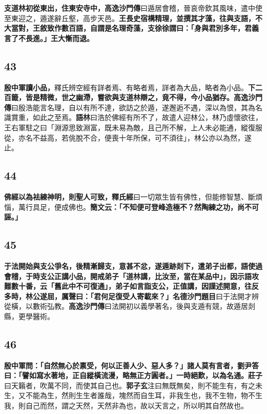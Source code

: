 \textbf{支道林初從東出，住東安寺中，}{\footnotesize \textbf{高逸沙門傳}曰遁居會稽，晉哀帝欽其風味，遣中使至東迎之，遁遂辭丘壑，高步天邑。}\textbf{王長史宿構精理，並撰其才藻，往與支語，不大當對，王敘致作數百語，自謂是名理奇藻，支徐徐謂曰：「身與君別多年，君義言了不長進。」王大慚而退。}

\subsection*{43}

\textbf{殷中軍讀小品，}{\footnotesize 釋氏辨空經有詳者焉、有略者焉，詳者為大品，略者為小品。}\textbf{下二百籤，皆是精微，世之幽滯，嘗欲與支道林辯之，竟不得，今小品猶存。}{\footnotesize \textbf{高逸沙門傳}曰殷浩能言名理，自以有所不達，欲訪之於遁，遂邂逅不遇，深以為恨，其為名識賞重，如此之至焉。\textbf{語林}曰浩於佛經有所不了，故遣人迎林公，林乃虛懷欲往，王右軍駐之曰「淵源思致淵富，既未易為敵，且己所不解，上人未必能通，縱復服從，亦名不益高，若佻脫不合，便喪十年所保，可不須往」，林公亦以為然，遂止。}

\subsection*{44}

\textbf{佛經以為袪練神明，則聖人可致，}{\footnotesize \textbf{釋氏經}曰一切眾生皆有佛性，但能修智慧、斷煩惱，萬行具足，便成佛也。}\textbf{簡文云：「不知便可登峰造極不？然陶練之功，尚不可誣。」}

\subsection*{45}

\textbf{于法開始與支公爭名，後精漸歸支，意甚不忿，遂遁跡剡下，遣弟子出都，語使過會稽，于時支公正講小品，開戒弟子「道林講，比汝至，當在某品中」，因示語攻難數十番，云「舊此中不可復通」，弟子如言詣支公，正值講，因謹述開意，往反多時，林公遂屈，厲聲曰：「君何足復受人寄載來？」}{\footnotesize \textbf{名德沙門題目}曰于法開才辨從橫，以數術弘教。\textbf{高逸沙門傳}曰法開初以義學著名，後與支遁有競，故遁居剡縣，更學醫術。}

\subsection*{46}

\textbf{殷中軍問：「自然無心於禀受，何以正善人少、惡人多？」諸人莫有言者，劉尹答曰：「譬如寫水著地，正自縱橫流漫，略無正方圓者。」一時絕歎，以為名通。}{\footnotesize \textbf{莊子}曰天籟者，吹萬不同，而使其自己也。\textbf{郭子玄}注曰無既無矣，則不能生有，有之未生，又不能為生，然則生生者誰哉，塊然而自生耳，非我生也，我不生物，物不生我，則自己而然，謂之天然，天然非為也，故以天言之，所以明其自然故也。}

